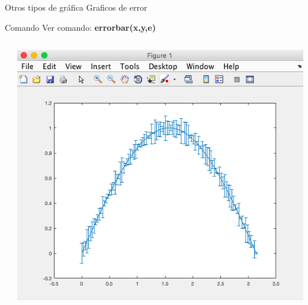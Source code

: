 \documentclass{bredelebeamer}
\begin{document}
\begin{frame}{Otros tipos de gráfica}
Graficos de error
\begin{exampleblock}{Comando}
Ver comando: \textbf{errorbar(x,y,e)}
\end{exampleblock}
\begin{columns}
\begin{column}{0.5\textwidth}

\end{column}
\begin{column}{0.5\textwidth}
\begin{center}
\includegraphics[scale=0.2]{images/pantalla27.png}
\end{center}
\end{column}
\end{columns}
\end{frame}
\end{document}
